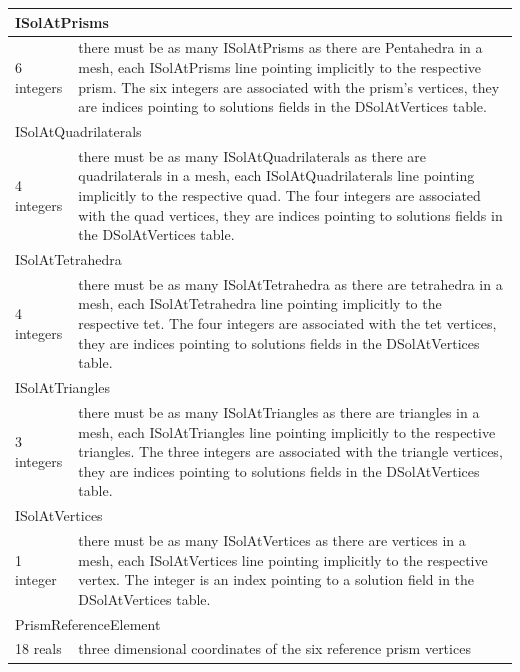 \documentclass[a4paper,12pt]{article}
\begin{document}
\begin{longtable}{|m{4cm}|m{11cm}|}
\multicolumn{2}{|l|}{ISolAtPrisms} \\
\hline
6 integers & there must be as many ISolAtPrisms as there are Pentahedra in a mesh, each ISolAtPrisms line pointing implicitly to the respective prism. The six integers are associated with the prism's vertices, they are indices pointing to solutions fields in the DSolAtVertices table. \\
\hline\hline

\multicolumn{2}{|l|}{ISolAtQuadrilaterals} \\
\hline
4 integers & there must be as many ISolAtQuadrilaterals as there are quadrilaterals in a mesh, each ISolAtQuadrilaterals line pointing implicitly to the respective quad. The four integers are associated with the quad vertices, they are indices pointing to solutions fields in the DSolAtVertices table. \\
\hline\hline

\multicolumn{2}{|l|}{ISolAtTetrahedra} \\
\hline
4 integers & there must be as many ISolAtTetrahedra as there are tetrahedra in a mesh, each ISolAtTetrahedra line pointing implicitly to the respective tet. The four integers are associated with the tet vertices, they are indices pointing to solutions fields in the DSolAtVertices table. \\
\hline\hline

\multicolumn{2}{|l|}{ISolAtTriangles} \\
\hline
3 integers & there must be as many ISolAtTriangles as there are triangles in a mesh, each ISolAtTriangles line pointing implicitly to the respective triangles. The three integers are associated with the triangle vertices, they are indices pointing to solutions fields in the DSolAtVertices table. \\
\hline\hline

\multicolumn{2}{|l|}{ISolAtVertices} \\
\hline
1 integer & there must be as many ISolAtVertices as there are vertices in a mesh, each ISolAtVertices line pointing implicitly to the respective vertex. The integer is an index pointing to a solution field in the DSolAtVertices table. \\
\hline\hline

\multicolumn{2}{|l|}{PrismReferenceElement} \\
\hline
18 reals & three dimensional coordinates of the six reference prism vertices \\
\hline\hline


\end{longtable}
\end{document}

